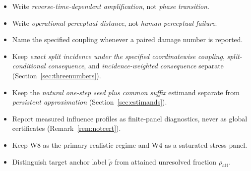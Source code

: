 \documentclass[11pt,a4paper]{article}
\theoremstyle{plain}
\theoremstyle{definition}
\theoremstyle{remark}
\newcommand{\rholabel}{\widetilde{\rho}}
\newcommand{\rhoatt}{\rho_{\mathrm{att}}}
\begin{document}
\begin{itemize}[leftmargin=1.4em,itemsep=2pt]
\item Write \emph{reverse-time-dependent amplification}, not \emph{phase
transition}.
\item Write \emph{operational perceptual distance}, not \emph{human perceptual
failure}.
\item Name the specified coupling whenever a paired damage number is reported.
\item Keep \emph{exact split incidence under the specified coordinatewise
coupling}, \emph{split-conditional consequence}, and
\emph{incidence-weighted consequence} separate
(Section~\ref{sec:threenumbers}).
\item Keep the \emph{natural one-step seed plus common suffix} estimand separate
from \emph{persistent approximation} (Section~\ref{sec:estimands}).
\item Report measured influence profiles as finite-panel diagnostics, never as
global certificates (Remark~\ref{rem:notcert}).
\item Keep W8 as the primary realistic regime and W4 as a saturated stress panel.
\item Distinguish target anchor label $\rholabel$ from attained unresolved
fraction $\rhoatt$.
\end{itemize}


\end{document}
